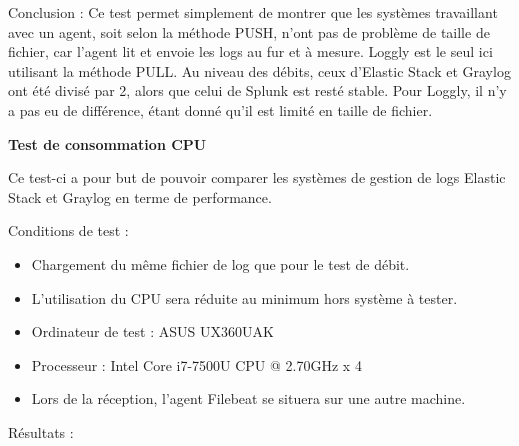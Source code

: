 \documentclass[paper=a4, fontsize=11pt]{scrartcl}
\begin{document}
Conclusion :
Ce test permet simplement de montrer que les systèmes travaillant avec un agent, soit selon la méthode PUSH, n'ont pas de problème de taille de fichier, car l'agent lit et envoie les logs au fur et à mesure. Loggly est le seul ici utilisant la méthode PULL. Au niveau des débits, ceux d'Elastic Stack et Graylog ont été divisé par 2, alors que celui de Splunk est resté stable. Pour Loggly, il n'y a pas eu de différence, étant donné qu'il est limité en taille de fichier.


\textbf{Test de consommation CPU}

Ce test-ci a pour but de pouvoir comparer les systèmes de gestion de logs Elastic Stack et Graylog en terme de performance.

Conditions de test :
\begin{itemize}
    \item Chargement du même fichier de log que pour le test de débit.
    \item L'utilisation du CPU sera réduite au minimum hors système à tester.
    \item Ordinateur de test : ASUS UX360UAK
    \item Processeur : Intel Core i7-7500U CPU @ 2.70GHz x 4
    \item Lors de la réception, l'agent Filebeat se situera sur une autre machine.
\end{itemize}

Résultats :
\end{document}
